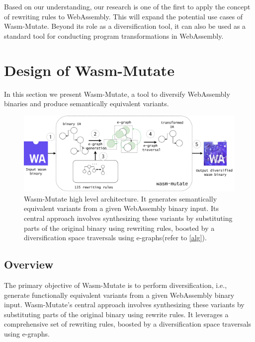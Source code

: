 \documentclass[a4paper,fleqn]{cas-dc}
\newcommand{\tool}{{\sc Wasm-Mutate}\xspace}
\begin{document}
Based on our understanding, our research is one of the first to apply the concept of rewriting rules to WebAssembly.
This will expand the potential use cases of \tool. 
Beyond its role as a diversification tool, it can also be used as a standard tool for conducting program transformations in WebAssembly.







\section {Design of \tool}
\label{tech}

In this section we present \tool, a tool to diversify
WebAssembly binaries and produce semantically equivalent variants.
\begin{figure}[h!]
    \centering
    \includegraphics[width=0.9\linewidth]{figures/workflow.v2.pdf}
    \caption{ \tool high level architecture.  It generates semantically equivalent variants from a given WebAssembly binary input. 
    Its central approach involves synthesizing these variants by substituting parts of the original binary using rewriting rules, boosted by a diversification space traversals using e-graphs(refer to \autoref{alg}).}
  \label{fig:wasm-mutate}
\end{figure}


\subsection{Overview}
The primary objective of \tool is to perform diversification, i.e., generate functionally equivalent variants from a given WebAssembly binary input. 
\tool's central approach involves synthesizing these variants by substituting parts of the original binary using rewrite rules. 
It leverages a comprehensive set of rewriting rules, boosted by a diversification space traversals using e-graphs.
\end{document}
